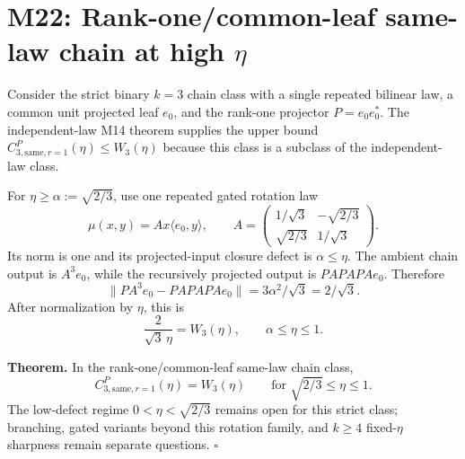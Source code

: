 \section*{M22: Rank-one/common-leaf same-law chain at high $\eta$}
\label{sec:m22-rank-one-high-eta}

Consider the strict binary $k=3$ chain class with a single repeated bilinear
law, a common unit projected leaf $e_0$, and the rank-one projector
$P=e_0e_0^*$.  The independent-law M14 theorem supplies the upper bound
$C_{3,\mathrm{same},r=1}^P(\eta)\le W_3(\eta)$ because this class is a
subclass of the independent-law class.

For $\eta\ge\alpha:=\sqrt{2/3}$, use one repeated gated rotation law
\[
 \mu(x,y)=A x\langle e_0,y\rangle,
 \qquad
 A=\begin{pmatrix}1/\sqrt3&-\sqrt{2/3}\\
                    \sqrt{2/3}&1/\sqrt3\end{pmatrix}.
\]
Its norm is one and its projected-input closure defect is $\alpha\le\eta$.
The ambient chain output is $A^3e_0$, while the recursively projected output
is $P A P A P A e_0$.  Therefore
\[
 \|P A^3e_0-P A P A P A e_0\|
 =3\alpha^2/\sqrt3=2/\sqrt3.
\]
After normalization by $\eta$, this is
\[
 \frac{2}{\sqrt3\,\eta}=W_3(\eta),
 \qquad \alpha\le\eta\le1.
\]

\textbf{Theorem.} In the rank-one/common-leaf same-law chain class,
\[
 \boxed{C_{3,\mathrm{same},r=1}^P(\eta)=W_3(\eta)}
 \qquad\text{for }\sqrt{2/3}\le\eta\le1.
\]
The low-defect regime $0<\eta<\sqrt{2/3}$ remains open for this strict
class; branching, gated variants beyond this rotation family, and $k\ge4$
fixed-$\eta$ sharpness remain separate questions.
\hfill$\square$
